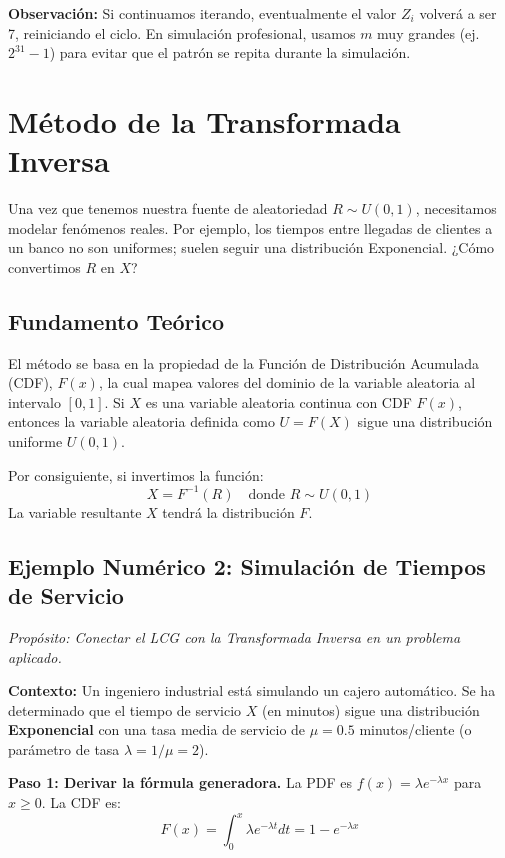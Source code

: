 \documentclass[11pt, letterpaper]{article}
\begin{document}
\textbf{Observación:} Si continuamos iterando, eventualmente el valor $Z_i$ volverá a ser 7, reiniciando el ciclo. En simulación profesional, usamos $m$ muy grandes (ej. $2^{31}-1$) para evitar que el patrón se repita durante la simulación.

\section{Método de la Transformada Inversa}

Una vez que tenemos nuestra fuente de aleatoriedad $R \sim U(0,1)$, necesitamos modelar fenómenos reales. Por ejemplo, los tiempos entre llegadas de clientes a un banco no son uniformes; suelen seguir una distribución Exponencial. ¿Cómo convertimos $R$ en $X$?

\subsection{Fundamento Teórico}
El método se basa en la propiedad de la Función de Distribución Acumulada (CDF), $F(x)$, la cual mapea valores del dominio de la variable aleatoria al intervalo $[0,1]$.
Si $X$ es una variable aleatoria continua con CDF $F(x)$, entonces la variable aleatoria definida como $U = F(X)$ sigue una distribución uniforme $U(0,1)$.

Por consiguiente, si invertimos la función:
\begin{equation}
    X = F^{-1}(R) \quad \text{donde } R \sim U(0,1)
\end{equation}
La variable resultante $X$ tendrá la distribución $F$.

\subsection{Ejemplo Numérico 2: Simulación de Tiempos de Servicio}
\textit{Propósito: Conectar el LCG con la Transformada Inversa en un problema aplicado.}

\textbf{Contexto:} Un ingeniero industrial está simulando un cajero automático. Se ha determinado que el tiempo de servicio $X$ (en minutos) sigue una distribución \textbf{Exponencial} con una tasa media de servicio de $\mu = 0.5$ minutos/cliente (o parámetro de tasa $\lambda = 1/\mu = 2$).

\textbf{Paso 1: Derivar la fórmula generadora.}
La PDF es $f(x) = \lambda e^{-\lambda x}$ para $x \ge 0$.
La CDF es:
$$ F(x) = \int_{0}^{x} \lambda e^{-\lambda t} dt = 1 - e^{-\lambda x} $$
\end{document}
